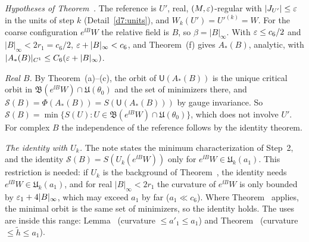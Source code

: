 \begin{detail}\label{d7:setting}
\begin{step}
\emph{Hypotheses of Theorem~.} The reference is $U'$, real, $(M,\varepsilon)$-regular with $|J_{U'}|\le\varepsilon$ in the units of step $k$ (Detail~\ref{d7:units}), and $W_k(U')=U'^{(k)}=W$. For the coarse configuration $e^{\ii B}W$ the relative field is $B$, so $\beta=|B|_\infty$. With $\varepsilon\le c_6/2$ and $|B|_\infty<2r_1=c_6/2$, $\varepsilon+|B|_\infty<c_6$, and Theorem~(f) gives $A_*(B)$, analytic, with $|A_*(B)|_{C^1}\le C_6(\varepsilon+|B|_\infty)$.
\end{step}
\begin{step}
\emph{Real $B$.} By Theorem~(a)--(c), the orbit of $\mathsf U(A_*(B))$ is the unique critical orbit in $\mathfrak B(e^{\ii B}W)\cap\mathfrak U(\theta_0)$ and the set of minimizers there, and $\mathcal S(B)=\Phi(A_*(B))=S(\mathsf U(A_*(B)))$ by gauge invariance. So $\mathcal S(B)=\min\{S(U):U\in\mathfrak B(e^{\ii B}W)\cap\mathfrak U(\theta_0)\}$, which does not involve $U'$. For complex $B$ the independence of the reference follows by the identity theorem.
\end{step}
\begin{step}
\emph{The identity with $U_k$.} The note states the minimum characterization of Step~2, and the identity $\mathcal S(B)=S(U_k(e^{\ii B}W))$ only for $e^{\ii B}W\in\mathfrak U_k(a_1)$. This restriction is needed: if $U_k$ is the background of Theorem~, the identity needs $e^{\ii B}W\in\mathfrak U_k(a_1)$, and for real $|B|_\infty<2r_1$ the curvature of $e^{\ii B}W$ is only bounded by $\varepsilon_1+4|B|_\infty$, which may exceed $a_1$ by far ($a_1\ll c_6$). Where Theorem~ applies, the minimal orbit is the same set of minimizers, so the identity holds. The uses are inside this range: Lemma~ (curvature $\le a'_1\le a_1$) and Theorem~ (curvature $\le\tilde h\le a_1$).
\end{step}
\end{detail}

